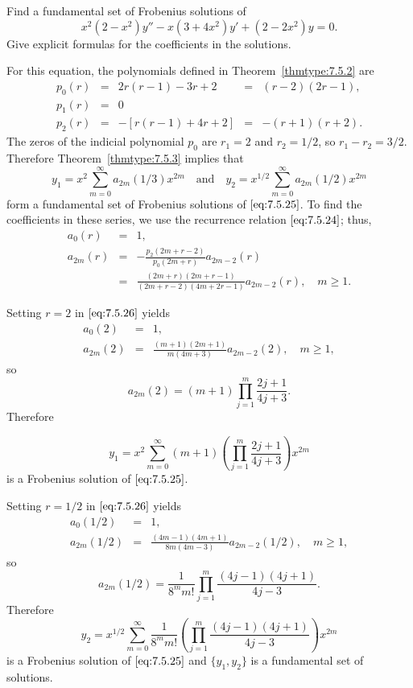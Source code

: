 \documentclass{ximera}
\begin{document}
\begin{example}\label{example:7.5.3}
Find a fundamental set of   Frobenius solutions of
\begin{equation} \label{eq:7.5.25}
x^2(2-x^2)y''-x(3+4x^2)y'+(2-2x^2)y=0.
\end{equation}
Give explicit  formulas for the coefficients in the solutions.

\begin{explanation}
For  this equation,  the polynomials defined in
Theorem~\ref{thmtype:7.5.2} are
$$
\begin{array}{ccccc}
p_0(r)&=&2r(r-1)-3r+2&=&(r-2)(2r-1),\\
p_1(r)&=&0\\
p_2(r)&=&-\left[r(r-1)+4r+2\right]&=&-(r+1)(r+2).
\end{array}
$$
The zeros of the indicial polynomial $p_0$ are $r_1=2$
and $r_2=1/2$, so  $r_1-r_2=3/2$. Therefore
Theorem~\ref{thmtype:7.5.3} implies that
$$
y_1=x^2\sum_{m=0}^\infty a_{2m}(1/3)x^{2m}\quad\mbox{and}\quad
y_2=x^{1/2}\sum_{m=0}^\infty a_{2m}(1/2)x^{2m}
$$
form a fundamental set of  Frobenius solutions of $\eqref{eq:7.5.25}$.
To find the coefficients in these series, we use the recurrence relation $\eqref{eq:7.5.24}$;   thus,
\begin{equation} \label{eq:7.5.26}
\begin{array}{ccl}
a_0(r)&=&1,\\
a_{2m}(r)&=&-\frac{p_2(2m+r-2)}{p_0(2m+r)}a_{2m-2}(r)\\
&=&\frac{(2m+r)(2m+r-1)}{(2m+r-2)(4m+2r-1)}a_{2m-2}(r),\quad m\geq1.
\end{array}
\end{equation}

Setting $r=2$ in $\eqref{eq:7.5.26}$ yields
\begin{eqnarray*}
a_0(2)&=&1,\\
a_{2m}(2)&=&\frac{(m+1)(2m+1)}{m(4m+3)}a_{2m-2}(2),\quad m\geq1,
\end{eqnarray*}
so
$$
a_{2m}(2)=(m+1)\prod_{j=1}^m\frac{2j+1}{4j+3}.
$$
Therefore

$$
 y_1=x^2\sum_{m=0}^\infty
(m+1)\left(\prod_{j=1}^m\frac{2j+1}{4j+3}\right)x^{2m}
$$
is a Frobenius solution of $\eqref{eq:7.5.25}$.


Setting $r=1/2$ in $\eqref{eq:7.5.26}$ yields
\begin{eqnarray*}
a_0(1/2)&=&1,\\
a_{2m}(1/2)&=&\frac{(4m-1)(4m+1)}{8m(4m-3)}a_{2m-2}(1/2),\quad
m\geq1,
\end{eqnarray*}
so
$$
a_{2m}(1/2)=\frac{1}{8^mm!}\prod_{j=1}^m\frac{(4j-1)(4j+1)}{4j-3}.
$$
Therefore
$$
y_2=x^{1/2}\sum_{m=0}^\infty
\frac{1}{8^mm!}\left(\prod_{j=1}^m\frac{(4j-1)(4j+1)}{4j-3}\right)x^{2m}
$$
is a Frobenius solution of $\eqref{eq:7.5.25}$ and $\{y_1,y_2\}$ is a
fundamental set of solutions.
\end{explanation}
\end{example}
\end{document}
